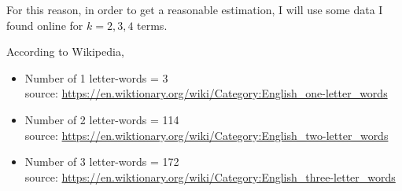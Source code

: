 \documentclass{assignment}
\begin{document}
\begin{enumerate}
  For this reason, in order to get a reasonable estimation, I will use some data I found online for $k=2,3,4$ terms.

  According to Wikipedia,
  \begin{itemize}
  \item Number of 1 letter-words = 3\\
    source: \url{https://en.wiktionary.org/wiki/Category:English_one-letter_words}
  \item Number of 2 letter-words = 114\\
    source: \url{https://en.wiktionary.org/wiki/Category:English_two-letter_words}
  \item Number of 3 letter-words = 172\\
    source: \url{https://en.wiktionary.org/wiki/Category:English_three-letter_words}
  \end{itemize}


\end{enumerate}
\end{document}
